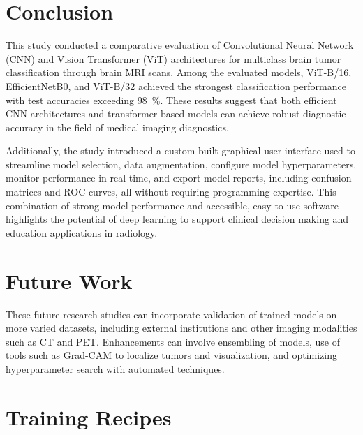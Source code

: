 \documentclass[11pt]{article}
\begin{document}
\section*{Conclusion}

This study conducted a comparative evaluation of Convolutional Neural Network (CNN) and Vision Transformer (ViT) architectures for multiclass brain tumor classification through brain MRI scans. Among the evaluated models, ViT-B/16, EfficientNetB0, and ViT-B/32 achieved the strongest classification performance with test accuracies exceeding 98~\%. These results suggest that both efficient CNN architectures and transformer-based models can achieve robust diagnostic accuracy in the field of medical imaging diagnostics.

Additionally, the study introduced a custom-built graphical user interface used to streamline model selection, data augmentation, configure model hyperparameters, monitor performance in real-time, and export model reports, including confusion matrices and ROC curves, all without requiring programming expertise. This combination of strong model performance and accessible, easy-to-use software highlights the potential of deep learning to support clinical decision making and education applications in radiology.

\section*{Future Work}
These future research studies can incorporate validation of trained models on more varied datasets, including external institutions and other imaging modalities such as CT and PET. Enhancements can involve ensembling of models, use of tools such as Grad-CAM to localize tumors and visualization, and optimizing hyperparameter search with automated techniques.

\printbibliography

\appendix
\renewcommand{\thesection}{Appendix \Alph{section}}

\clearpage
\pagestyle{fancy}
\fancyhf{} 
\renewcommand{\headrulewidth}{0pt} 

\section{Training Recipes}
\end{document}
